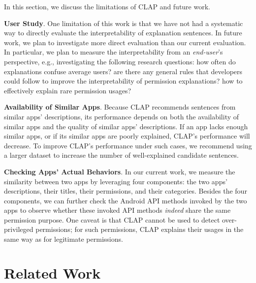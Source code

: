 In this section, we discuss the limitations of CLAP and future work.

\textbf{User Study}. One limitation of this work is that we have not had a systematic way to directly evaluate the interpretability of explanation sentences. 
In future work, we plan to investigate more direct evaluation than our current evaluation. In particular, we plan to measure the interpretability from an \emph{end-user}'s perspective, e.g., investigating the following  research questions: how often do explanations confuse average users? 
are there any general rules that developers could follow to improve the interpretability of permission explanations? 
how to effectively explain rare permission usages? 

\textbf{Availability of Similar Apps}. 
Because CLAP recommends sentences from similar apps' descriptions, its performance depends on 
both the availability of similar apps and the quality of similar apps' descriptions. 
If an app lacks enough similar apps, or if its similar apps are poorly explained, CLAP's performance will decrease. 
To improve CLAP's performance under such cases, we recommend using a larger dataset to increase the number of well-explained candidate sentences. 

\textbf{Checking Apps' Actual Behaviors}. 
In our current work, we measure the similarity between two apps by leveraging four components: the two apps' descriptions, their titles, their permissions, and their categories. 
Besides the four components, we can further check the Android API methods invoked by the two apps to observe whether these invoked API methods \emph{indeed} share the same permission purpose.  
One caveat is that CLAP cannot be used to detect over-privileged permissions; for such permissions, CLAP explains their usages in the same way as for legitimate permissions. 


\vspace{-0.1in}
\section{Related Work}
\label{sec:relwork}


